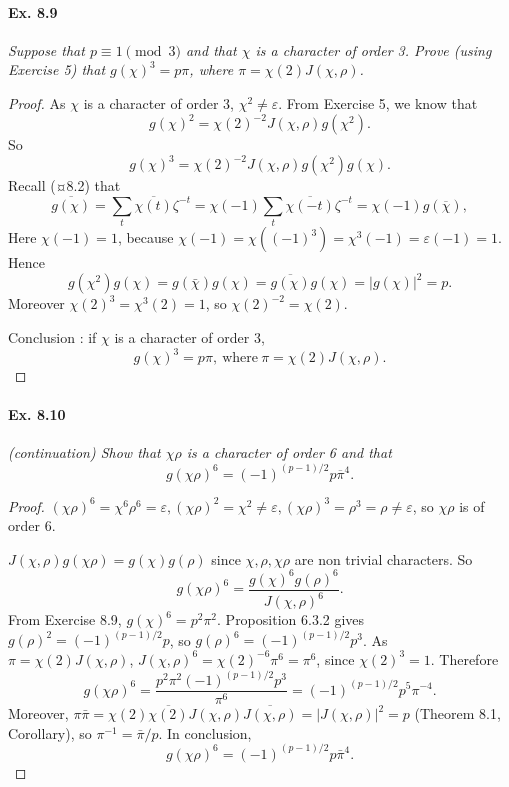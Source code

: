 \documentclass[11pt,a4paper]{article}
\begin{document}
{\paragraph{Ex. 8.9}

{\it Suppose that $p\equiv 1 \pmod 3$ and that $\chi$ is a character of order 3. Prove (using Exercise 5) that $g(\chi)^3 = p\pi$, where $\pi = \chi(2)J(\chi,\rho)$.
}

\begin{proof}
As $\chi$ is a character of order 3, $\chi^2\neq \varepsilon$. From Exercise 5, we know that
$$g(\chi)^2 = \chi(2)^{-2} J(\chi,\rho) g(\chi^2).$$
So
$$g(\chi)^3 = \chi(2)^{-2} J(\chi,\rho) g(\chi^2)g(\chi).$$
Recall  (¤8.2) that
$$\overline{g(\chi)} = \sum_t \overline{\chi(t)} \zeta^{-t} = \chi(-1) \sum_t \overline{\chi(-t)} \zeta^{-t} = \chi(-1) g(\overline{\chi}),$$
Here $\chi(-1) = 1$, because $\chi(-1) = \chi((-1)^3) = \chi^3(-1) = \varepsilon(-1) = 1$.
Hence
$$g(\chi^2) g(\chi) = g(\bar{\chi}) g(\chi) =\overline{g(\chi)} g(\chi) = \vert g(\chi) \vert^2 =p.$$
Moreover $\chi(2)^3 = \chi^3(2) = 1$, so $\chi(2)^{-2} = \chi(2)$.

\medskip

Conclusion : if $\chi$ is a character of order 3,
 $$g(\chi)^3 = p \pi, \ \mathrm{where}\ \pi = \chi(2) J(\chi,\rho).$$
\end{proof}

\paragraph{Ex. 8.10}

{\it (continuation) Show that $\chi \rho$ is a character of order 6 and that $$g(\chi \rho)^6 = (-1)^{(p-1)/2} p \overline{\pi}^4.$$
}

\begin{proof}
$(\chi \rho)^6 = \chi^6 \rho^6 = \varepsilon, (\chi \rho)^2 = \chi^2 \neq \varepsilon, (\chi \rho)^3 = \rho^3 = \rho \neq \varepsilon$, so  $\chi \rho$ is of order 6.

$J(\chi,\rho) g(\chi \rho) = g(\chi) g(\rho)$ since $\chi, \rho, \chi \rho$ are non trivial characters. So
$$g(\chi \rho)^6 = \frac{g(\chi)^6 g(\rho)^6}{J(\chi, \rho)^6}.$$
From Exercise 8.9, $g(\chi)^6 = p^2 \pi^2$. Proposition 6.3.2 gives $g(\rho)^2 = (-1)^{(p-1)/2} p$, so $g(\rho)^6 =  (-1)^{(p-1)/2} p^3$. 
As $\pi = \chi(2) J(\chi,\rho)$,  $J(\chi,\rho)^6 = \chi(2)^{-6} \pi^6 = \pi^6$, since $\chi(2)^3=1$. Therefore
 $$g(\chi \rho)^6 = \frac{p^2 \pi^2 (-1)^{(p-1)/2} p^3}{\pi^6} = (-1)^{(p-1)/2} p^5 \pi^{-4}.$$
 Moreover, $\pi \bar{\pi} = \chi(2) \overline{\chi(2)} J(\chi,\rho) \overline {J(\chi,\rho)} = \vert J(\chi,\rho) \vert^2 =p$ (Theorem 8.1, Corollary), so $ \pi^{-1} = \bar{\pi}/p$. In conclusion,
$$g(\chi \rho)^6 = (-1)^{(p-1)/2} p \bar{\pi}^4.$$
\end{proof}

}
\end{document}

